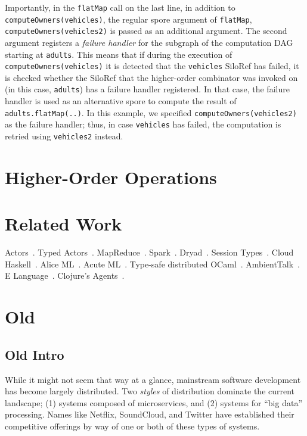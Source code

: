 \documentclass{sigplanconf}
\theoremstyle{definition}
\theoremstyle{definition}
\begin{document}
Importantly, in the \verb|flatMap| call on the last line, in addition to
\verb|computeOwners(vehicles)|, the regular spore argument of \verb|flatMap|,
\verb|computeOwners(vehicles2)| is passed as an additional argument. The
second argument registers a \emph{failure handler} for the subgraph of the
computation DAG starting at \verb|adults|. This means that if during the
execution of \verb|computeOwners(vehicles)| it is detected that the
\verb|vehicles| SiloRef has failed, it is checked whether the SiloRef that the
higher-order combinator was invoked on (in this case, \verb|adults|) has a
failure handler registered. In that case, the failure handler is used as an
alternative spore to compute the result of \verb|adults.flatMap(..)|. In this
example, we specified \verb|computeOwners(vehicles2)| as the failure handler;
thus, in case \verb|vehicles| has failed, the computation is retried using
\verb|vehicles2| instead.





\section{Higher-Order Operations}
\label{sec:higher-order-operations}


\section{Related Work}

Actors~\cite{Actors, ScalaActors}. Typed Actors~\cite{TypedActors}. MapReduce~\cite{MapReduce}. Spark~\cite{Spark}. Dryad~\cite{Dryad}. Session Types~\cite{SessionTypes}. Cloud Haskell~\cite{CloudHaskell}. Alice ML~\cite{AliceML}. Acute ML~\cite{AcuteML}. Type-safe distributed OCaml~\cite{DistOCaml}. AmbientTalk~\cite{AmbientTalk}. E Language~\cite{ELang}. Clojure's Agents~\cite{Clojure}.


\section{Old}

\subsection{Old Intro}


While it might not seem that way at a glance, mainstream software development
has become largely distributed. Two {\em styles} of distribution
dominate the current landscape; (1) systems composed of microservices,
and (2) systems for ``big data'' processing. Names like Netflix, SoundCloud,
and Twitter have established their competitive offerings by way of one or
both of these types of systems.
\end{document}
